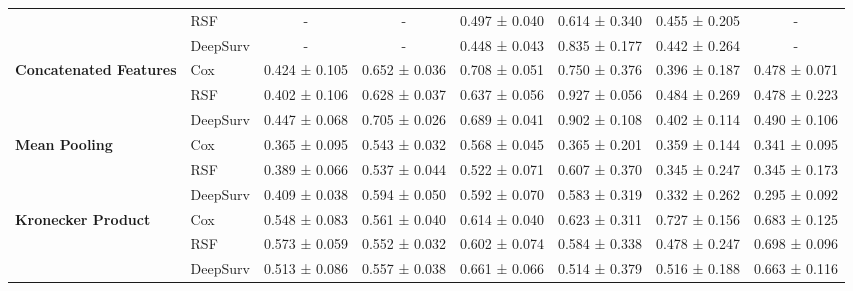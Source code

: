 \begin{sidewaystable}[htbp]
\begin{tabular}{@{}llcccccc@{}}
        & RSF & - & - & 0.497 ± 0.040 & 0.614 ± 0.340 & 0.455 ± 0.205 & - \\
        & DeepSurv & - & - & 0.448 ± 0.043 & 0.835 ± 0.177 & 0.442 ± 0.264 & - \\
        \midrule
        \multirow{3}{*}{\textbf{Concatenated Features}} & Cox & 0.424 ± 0.105 & 0.652 ± 0.036 & 0.708 ± 0.051 & 0.750 ± 0.376 & 0.396 ± 0.187 & 0.478 ± 0.071 \\
        & RSF & 0.402 ± 0.106 & 0.628 ± 0.037 & 0.637 ± 0.056 & 0.927 ± 0.056 & 0.484 ± 0.269 & 0.478 ± 0.223 \\
        & DeepSurv & 0.447 ± 0.068 & 0.705 ± 0.026 & 0.689 ± 0.041 & 0.902 ± 0.108 & 0.402 ± 0.114 & 0.490 ± 0.106 \\
        \midrule
        \multirow{3}{*}{\textbf{Mean Pooling}} & Cox & 0.365 ± 0.095 & 0.543 ± 0.032 & 0.568 ± 0.045 & 0.365 ± 0.201 & 0.359 ± 0.144 & 0.341 ± 0.095 \\
        & RSF & 0.389 ± 0.066 & 0.537 ± 0.044 & 0.522 ± 0.071 & 0.607 ± 0.370 & 0.345 ± 0.247 & 0.345 ± 0.173 \\
        & DeepSurv & 0.409 ± 0.038 & 0.594 ± 0.050 & 0.592 ± 0.070 & 0.583 ± 0.319 & 0.332 ± 0.262 & 0.295 ± 0.092 \\
        \midrule
        \multirow{3}{*}{\textbf{Kronecker Product}} & Cox & 0.548 ± 0.083 & 0.561 ± 0.040 & 0.614 ± 0.040 & 0.623 ± 0.311 & 0.727 ± 0.156 & 0.683 ± 0.125 \\
        & RSF & 0.573 ± 0.059 & 0.552 ± 0.032 & 0.602 ± 0.074 & 0.584 ± 0.338 & 0.478 ± 0.247 & 0.698 ± 0.096 \\
        & DeepSurv & 0.513 ± 0.086 & 0.557 ± 0.038 & 0.661 ± 0.066 & 0.514 ± 0.379 & 0.516 ± 0.188 & 0.663 ± 0.116 \\
        \bottomrule
    \end{tabular}
\end{sidewaystable}